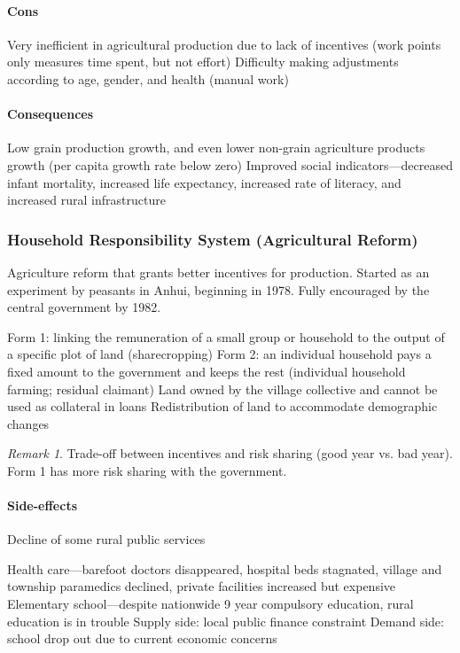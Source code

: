 \documentclass[11pt]{article}
\theoremstyle{definition}
\theoremstyle{remark}
\newtheorem*{remark}{Remark}
\begin{document}
\paragraph{Cons}
\begin{outline}[enumerate]
\1 Very inefficient in agricultural production due to lack of incentives (work points only measures time spent, but not effort)
\1 Difficulty making adjustments according to age, gender, and health (manual work)
\end{outline}

\paragraph{Consequences}
\begin{outline}[enumerate]
\1 Low grain production growth, and even lower non-grain agriculture products growth (per capita growth rate below zero)
\1 Improved social indicators---decreased infant mortality, increased life expectancy, increased rate of literacy, and increased rural infrastructure
\end{outline}

\subsubsection{Household Responsibility System (Agricultural Reform)}
Agriculture reform that grants better incentives for production. Started as an experiment by peasants in Anhui, beginning in 1978. Fully encouraged by the central government by 1982.
\begin{outline}[enumerate]
\1 Form 1: linking the remuneration of a small group or household to the output of a specific plot of land (sharecropping)
\1 Form 2: an individual household pays a fixed amount to the government and keeps the rest (individual household farming; residual claimant)
\1 Land owned by the village collective and cannot be used as collateral in loans
\1 Redistribution of land to accommodate demographic changes
\end{outline}

\begin{remark}
Trade-off between incentives and risk sharing (good year vs. bad year). Form 1 has more risk sharing with the government.
\end{remark}

\paragraph{Side-effects}
Decline of some rural public services
\begin{outline}[enumerate]
\1 Health care---barefoot doctors disappeared, hospital beds stagnated, village and township paramedics declined, private facilities increased but expensive
\1 Elementary school---despite nationwide 9 year compulsory education, rural education is in trouble
	\2 Supply side: local public finance constraint
	\2 Demand side: school drop out due to current economic concerns
\end{outline}
\end{document}
